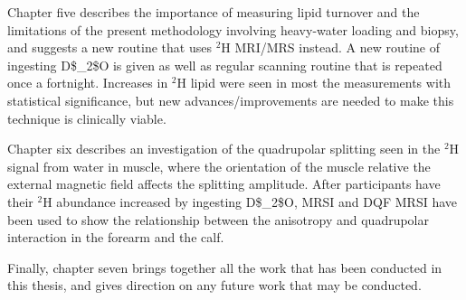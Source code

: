 Chapter five describes the importance of measuring lipid turnover and the limitations of the present methodology involving heavy-water loading and biopsy, and suggests a new routine that uses $^2$H \ac{MRI}/\ac{MRS} instead. A new routine of ingesting \ac{D$_2$O} is given as well as regular scanning routine that is repeated once a fortnight. Increases in $^2$H lipid were seen in most the measurements with statistical significance, but new advances/improvements are needed to make this technique is clinically viable.

Chapter six describes an investigation of the quadrupolar splitting seen in the $^2$H signal from water in muscle, where the orientation of the muscle relative the external magnetic field affects the splitting amplitude. After participants have their $^2$H abundance increased by ingesting \ac{D$_2$O}, \ac{MRSI} and \ac{DQF} \ac{MRSI} have been used to show the relationship between the anisotropy and quadrupolar interaction in the forearm and the calf.

Finally, chapter seven brings together all the work that has been conducted in this thesis, and gives direction on any future work that may be conducted.